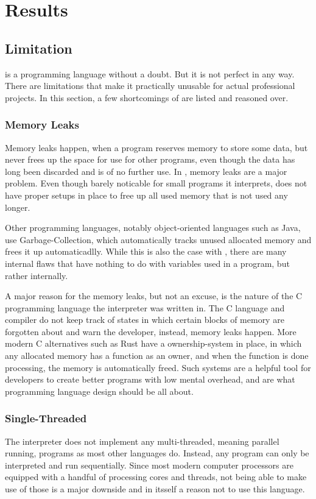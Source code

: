 \documentclass[12pt,a4paper,man]{apa7}
\begin{document}
\section{Results}
\subsection{Limitation}
\name is a programming language without a doubt. But it is not perfect in any
way. There are limitations that make it practically unusable for actual
professional projects. In this section, a few shortcomings of \name are listed
and reasoned over.

\subsubsection{Memory Leaks}
Memory leaks happen, when a program reserves memory to store some data, but
never frees up the space for use for other programs, even though the data
has long been discarded and is of no further use.
In \name, memory leaks are a major problem. Even though barely noticable for small
programs it interprets, \name does not have proper setups in place to free up
all used memory that is not used any longer.

Other programming languages, notably object-oriented languages such as Java,
use Garbage-Collection, which automatically tracks unused allocated memory and
frees it up automaticadlly. While this is also the case with \name, there are
many internal flaws that have nothing to do with variables used in a \name
program, but rather internally. 

A major reason for the memory leaks, but not an excuse, is the nature of the
C programming language the \name interpreter was written in. The C language and
compiler do not keep track of states in which certain blocks of memory are
forgotten about and warn the developer, instead, memory leaks happen.
More modern C alternatives such as Rust have a ownership-system in place,
in which any allocated memory has a function as an owner, and when the function
is done processing, the memory is automatically freed. Such systems are a
helpful tool for developers to create better programs with low mental overhead,
and are what programming language design should be all about.

\subsubsection{Single-Threaded}
The \name interpreter does not implement any multi-threaded, meaning parallel
running, programs as most other languages do. Instead, any \name program can
only be interpreted and run sequentially. Since most modern computer processors
are equipped with a handful of processing cores and threads, not being able to
make use of those is a major downside and in itsself a reason not to use this
language.
\end{document}
